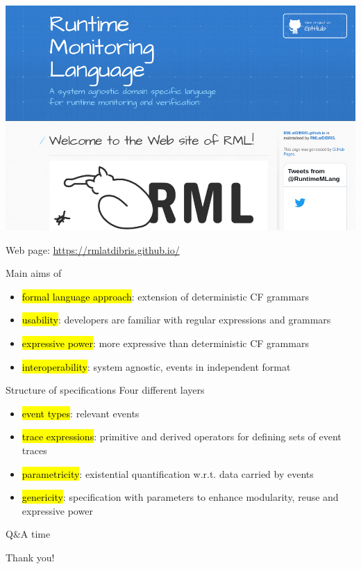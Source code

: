 \documentclass[10pt,usenames,dvipsnames]{beamer}
\begin{document}
\begin{frame}{\rml}
  \begin{center}
    \includegraphics[height=0.7\textheight]{images/rmlweb}
  \end{center}

  \rml Web page: \href{https://rmlatdibris.github.io/}{https://rmlatdibris.github.io/}
\end{frame}

\begin{frame}{\rml}

  \begin{block}{Main aims of \rml}
    \begin{itemize}
    \item \hl{formal language approach}: extension of deterministic CF grammars 
    \item \hl{usability}: developers are familiar with regular expressions and grammars
    \item \hl{expressive power}: more expressive than deterministic CF grammars
    \item \hl{interoperability}: system agnostic, events in independent format
    \end{itemize}
  \end{block}
\end{frame}

\begin{frame}{\rml}
  \begin{block}{Structure of \rml specifications}
    Four different layers
    \begin{itemize}
    \item \hl{event types}: relevant events 
    \item \hl{trace expressions}: primitive and derived operators for defining sets of event traces
    \item \hl{parametricity}: existential quantification w.r.t. data carried by events
    \item \hl{genericity}: specification with parameters to enhance modularity, reuse and expressive power
    \end{itemize}
  \end{block}
\end{frame}

\begin{frame}{Q\&A time}
\vspace*{16ex}
  \begin{center}
  \LARGE Thank you!
\end{center}
\end{frame}
\end{document}
